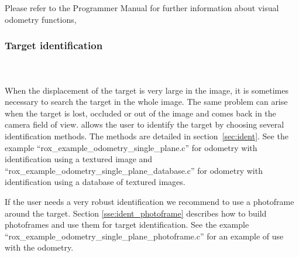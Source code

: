 Please refer to the Programmer Manual for further information about visual odometry functions, 

\subsubsection{Target identification}
\label{sss:odometry_single_plane_dent}
~\\~\\
When the displacement of the target is very large in the image, it is sometimes necessary to search the target in the whole image. The same problem can arise when the target is lost, occluded or out of the image and comes back in the camera field of view. \rox{} allows the user to identify the target by choosing several identification methods. The methods are detailed in section~\ref{sec:ident}. See the example ``rox\_example\_odometry\_single\_plane.c'' for odometry with identification using a textured image and ``rox\_example\_odometry\_single\_plane\_database.c'' for odometry with identification using a database of textured images.

If the user needs a very robust identification we recommend to use a
photoframe around the target. Section \ref{sse:ident_photoframe}
describes how to build photoframes and use them for target
identification.  See the example ``rox\_example\_odometry\_single\_plane\_photoframe.c'' for an
example of use with the odometry.

% 
% 
